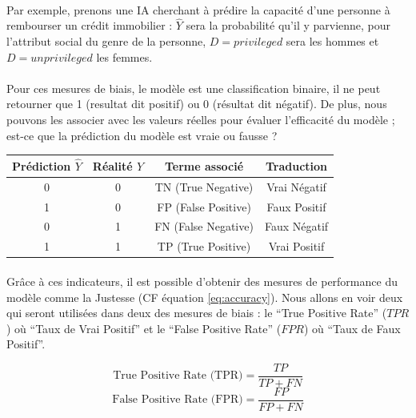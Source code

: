 \documentclass[10pt, french, a4paper]{report}
\begin{document}
\paragraph{}
Par exemple, prenons une IA cherchant à prédire la capacité d'une personne à rembourser un crédit immobilier : $\hat{Y}$ sera la probabilité qu'il y parvienne, pour l'attribut social du genre de la personne, $D = privileged$ sera les hommes et $D = unprivileged$ les femmes.

\paragraph{}
Pour ces mesures de biais, le modèle est une classification binaire, il ne peut retourner que 1 (resultat dit positif) ou 0 (résultat dit négatif). De plus, nous pouvons les associer avec les valeurs réelles pour évaluer l'efficacité du modèle ; est-ce que la prédiction du modèle est vraie ou fausse ?

\begin{center}
  \begin{tabular}{ |c|c|c|c| } 
   \hline
   Prédiction $\hat{Y}$ & Réalité $Y$ & Terme associé & Traduction \\ 
   \hline
   0 & 0 & TN (True Negative) & Vrai Négatif \\ 
   1 & 0 & FP (False Positive) & Faux Positif \\ 
   0 & 1 & FN (False Negative) & Faux Négatif \\ 
   1 & 1 & TP (True Positive) & Vrai Positif \\ 
   \hline
  \end{tabular}
\end{center}

\paragraph{}
Grâce à ces indicateurs, il est possible d'obtenir des mesures de performance du modèle comme la Justesse (CF équation \ref{eq:accuracy}). Nous allons en voir deux qui seront utilisées dans deux des mesures de biais : le ``True Positive Rate'' ($TPR$) où ``Taux de Vrai Positif'' et le ``False Positive Rate'' ($FPR$) où ``Taux de Faux Positif''.

\begin{equation}\label{eq:tpr}
  \text{True Positive Rate (TPR)} = \frac{TP}{TP + FN}
\end{equation}
\begin{equation}\label{eq:tpr}
  \text{False Positive Rate (FPR)} = \frac{FP}{FP + FN}
\end{equation}
\end{document}
